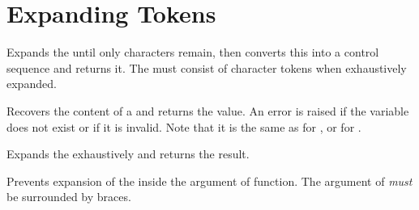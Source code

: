 \documentclass[oneside]{book}
\let\tn=\cs
\begin{document}
\section{Expanding Tokens}

\begin{function}{\expName}
\begin{syntax}
 
\end{syntax}
Expands the  until only characters
remain, then converts this into a control sequence and returns it.
The  must consist of character tokens %
when exhaustively expanded.%
\end{function}

\begin{function}{\expValue}
\begin{syntax}
 
\end{syntax}
Recovers the content of a  and returns the value.
An error is raised if the variable does not exist or if it is invalid.
Note that it is the same as  for , or  for .
\end{function}

\begin{function}{\expWhole}
\begin{syntax}
 
\end{syntax}
Expands the  exhaustively and returns the result.
\end{function}

\begin{function}{\unExpand}
\begin{syntax}
 
\end{syntax}
Prevents expansion of the  inside the argument of  function.
The argument of  \emph{must} be surrounded by braces.
\end{function}
\end{document}
